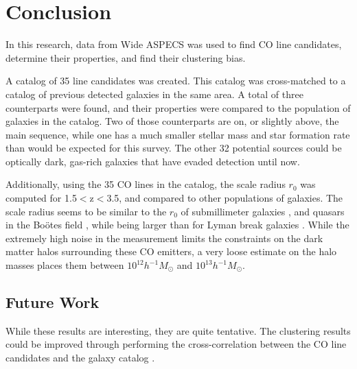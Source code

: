 \documentclass[twoside,single]{lion-msc}
\begin{document}
\chapter{Conclusion}

In this research, data from Wide ASPECS was used to find CO line candidates, determine their properties, and find their clustering bias.

A catalog of 35 line candidates was created. This catalog was cross-matched to a catalog of previous detected galaxies in the same area. A total of three counterparts were found, and their properties were compared to the population of galaxies in the catalog. Two of those counterparts are on, or slightly above, the main sequence, while one has a much smaller stellar mass and star formation rate than would be expected for this survey. The other 32 potential sources could be optically dark, gas-rich galaxies that have evaded detection until now. 

Additionally, using the 35 CO lines in the catalog, the scale radius $r_0$ was computed for 1.5$<$z$<$3.5, and compared to other populations of galaxies. The scale radius seems to be similar to the $r_0$ of submillimeter galaxies \cite{10.1111/j.1365-2966.2011.20303.x}, and quasars in the Bo\"otes field \cite{hickox2011clustering}, while being larger than for Lyman break galaxies \cite{adelberger2005spatial}. While the extremely high noise in the measurement limits the constraints on the dark matter halos surrounding these CO emitters, a very loose estimate on the halo masses places them between $10^{12} h^{-1}M_{\odot}$ and $10^{13} h^{-1}M_{\odot}$.


\section{Future Work}

While these results are interesting, they are quite tentative. The clustering results could be improved through performing the cross-correlation between the CO line candidates and the galaxy catalog \cite{hickox2011clustering, 10.1111/j.1365-2966.2011.20303.x, 10.1111/j.1365-2966.2008.14071.x}. 
\end{document}
